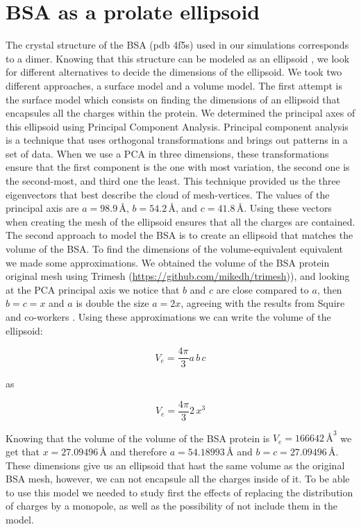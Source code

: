 
\section{BSA as a prolate ellipsoid}
\graphicspath{{rom_studies/figs/}}

The crystal structure of the BSA (pdb 4f5s) used in our simulations corresponds
to a dimer. Knowing that this structure can be modeled as an ellipsoid \cite{SquireETal1968},
we look for different alternatives to decide the dimensions of the ellipsoid. We took two
different approaches, a surface model and a volume model. The first attempt is 
the surface model which consists on finding the dimensions
of an ellipsoid that encapsules all the charges within the protein. We determined the principal axes of this
ellipsoid using Principal Component Analysis. Principal component analysis is a technique that
uses orthogonal transformations and brings out patterns in a set of data. When 
we use a PCA in three dimensions, these transformations ensure that the first 
component is the one with most variation, the second one is the second-most, and
third one the least. This technique provided us the three eigenvectors that best 
describe the cloud of mesh-vertices. The values of the principal axis are $a=98.9\, \text{\AA}$, $b=54.2\, \text{\AA}$, and $c=41.8\, \text{\AA}$. 
Using these vectors when creating the mesh of the ellipsoid ensures that all the charges are contained.
The second approach to model the BSA is to create an ellipsoid that matches the volume of the BSA. To find the dimensions 
of the volume-equivalent equivalent we made some approximations. We obtained the volume of the BSA protein original mesh
using Trimesh (\url{https://github.com/mikedh/trimesh})), and looking at the PCA principal axis we notice that $b$ and $c$ are close 
compared to $a$, then $b=c=x$ and $a$ is double the size $a=2x$, agreeing with the results from Squire and co-workers
\cite{SquireETal1968}. Using these approximations we can write the volume of the ellipsoid:

\begin{equation}
    V_e = \frac{4\pi}{3}a\,b\,c 
\end{equation}

as 

\begin{equation}
    V_e = \frac{4\pi}{3}2\,x^3
\end{equation}

Knowing that the volume of the volume of the BSA protein is $V_e = 166642 \, \text{\AA}^3$ we get that $x=27.09496 \, \text{\AA}$ 
and therefore $a=54.18993 \, \text{\AA}$ and $b=c=27.09496 \, \text{\AA}$. These dimensions give us an ellipsoid that hast the same volume 
as the original BSA mesh, however, we can not encapsule all the charges inside of it. To be able to use this model we needed to study first the 
effects of replacing the distribution of charges by a monopole, as well as the possibility of not include them in the model. 

